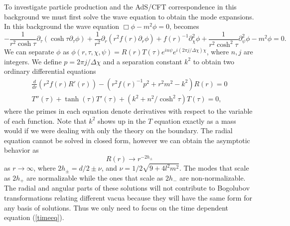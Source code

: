 \documentclass[a4paper,aps,prd,preprintnumbers,groupedaddress]{revtex4}
\begin{document}
To investigate particle production and the AdS/CFT correspondence in this
background we must  first solve the wave equation to obtain the mode expansions. In this background the wave equation $\Box \phi - m^2
\phi =0$, becomes
\begin{equation}
-\frac{1}{r^2 \cosh \tau} \partial _\tau (\cosh \tau \partial _\tau \phi) + \frac{1}{r^2} \partial _r ( r^2 f(r) \partial _r \phi) + f(r)
^{-1} \partial_\chi ^2 \phi + \frac{1}{r^2 \cosh ^2 \tau} \partial _\psi ^2 \phi - m^2 \phi = 0 .
\end{equation}
We can separate $\phi$ as $\phi(r,\tau,\chi,\psi) = R(r) T(\tau) e^{i n \psi} e^{i( 2\pi j/\Delta \chi) \chi}$, where $n,j$ are integers. We
define $p = 2 \pi j /\Delta \chi$ and a separation constant $k^2$ to obtain two ordinary differential equations
\begin{eqnarray}
\frac{d}{dr} (r^2 f(r) R'(r)) - (r^2 f(r)^{-1} p^2 + r^2 m^2 -k^2) R(r) = 0 \\
T''(\tau) + \tanh (\tau) T'(\tau) + (k^2 + n^2 /\cosh^2 \tau) T(\tau) = 0 , \label{timeeq}
\end{eqnarray}
where the primes in each equation denote derivatives with respect to the variable of each function.  Note that $k^2$ shows up in the
$T$ equation exactly as a mass would if we were dealing with only the theory on the boundary. The radial equation cannot be solved in closed
form, however we can obtain the asymptotic behavior as
\begin{equation}
R(r) \rightarrow r^{-2h_{\pm}}
\end{equation}
as $r \rightarrow \infty$, where $2h_\pm = d/2 \pm \nu$, and $\nu = 1/2 \sqrt{9+4l^2 m^2}$. The modes that scale as $2h_+$ are normalizable
while the ones that scale as $2h_-$ are non-normalizable.  The radial and angular parts of these solutions will not contribute to Bogolubov transformations relating different vacua because they will have the same form for any basis of solutions.   Thus we only need to focus on the time dependent equation (\ref{timeeq}).
\end{document}

